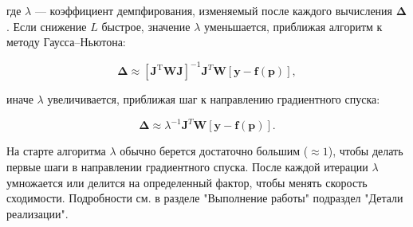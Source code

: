 где $\lambda$ — коэффициент демпфирования, изменяемый после каждого вычисления $\boldsymbol{\Delta}$. Если снижение $L$ быстрое, значение $\lambda$ уменьшается, приближая алгоритм к методу Гаусса–Ньютона:

$$
	\boldsymbol{\Delta}\approx[\mathbf J^{\mathrm T} \boldsymbol{W} \mathbf J]^{-1}\mathbf{J}^{T}\boldsymbol{W}[\mathbf y - \mathbf f\left ( \mathbf{p}\right )],
$$

иначе $\lambda$ увеличивается, приближая шаг к направлению градиентного спуска:

$$
	\boldsymbol{\Delta}\approx\lambda^{-1}\mathbf{J}^{T}\boldsymbol{W}[\mathbf y - \mathbf f\left ( \mathbf{p}\right )].
$$

На старте алгоритма $\lambda$ обычно берется достаточно большим ($\approx 1$), чтобы делать первые шаги в направлении градиентного спуска. После каждой итерации $\lambda$ умножается или делится на определенный фактор, чтобы менять скорость сходимости. 
Подробности см. в разделе "Выполнение работы"  подраздел "Детали реализации".

\newpage